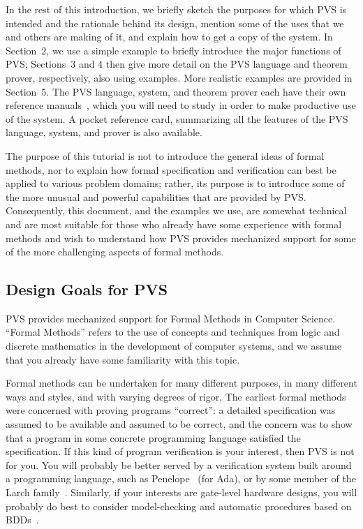 

In the rest of this introduction, we briefly sketch the purposes for
which PVS is intended and the rationale behind its design, mention
some of the uses that we and others are making of it, and explain how
to get a copy of the system.  In Section~2, we use a simple example to
briefly introduce the major functions of PVS; Sections~3 and 4 then
give more detail on the PVS language and theorem prover, respectively,
also using examples.  More realistic examples are provided in
Section~5.  The PVS language, system, and theorem prover each have
their own reference
manuals~\cite{PVS:language,PVS:prover,PVS:userguide}, which you will
need to study in order to make productive use of the system.  A pocket
reference card, summarizing all the features of the PVS language,
system, and prover is also available.

The purpose of this tutorial is not to introduce the general ideas of
formal methods, nor to explain how formal specification and
verification can best be applied to various problem domains; rather,
its purpose is to introduce some of the more unusual and powerful
capabilities that are provided by PVS.  Consequently, this
document, and the examples we use, are somewhat technical and are most
suitable for those who already have some experience with formal
methods and wish to understand how PVS provides mechanized support for
some of the more challenging aspects of formal methods.

\subsection{Design Goals for PVS}

PVS provides mechanized support for Formal Methods in Computer
Science.  ``Formal Methods'' refers to the use of concepts and
techniques from logic and discrete mathematics in the development of
computer systems, and we assume that you already have some
familiarity with this topic.


Formal methods can be undertaken for many different purposes, in many
different ways and styles, and with varying degrees of rigor.  The
earliest formal methods were concerned with proving programs
``correct'': a detailed specification was assumed to be available and
assumed to be correct, and the concern was to show that a program in
some concrete programming language satisfied the specification.  If
this kind of program verification is your interest, then PVS is not
for you.  You will probably be better served by a verification system
built around a programming language, such as Penelope~\cite{Prasad92} (for
Ada), or by some member of the Larch family~\cite{Larch85}.
Similarly, if your interests are gate-level hardware designs, you
will probably do best to consider model-checking and automatic
procedures based on BDDs~\cite{Clarke-etal90}.

